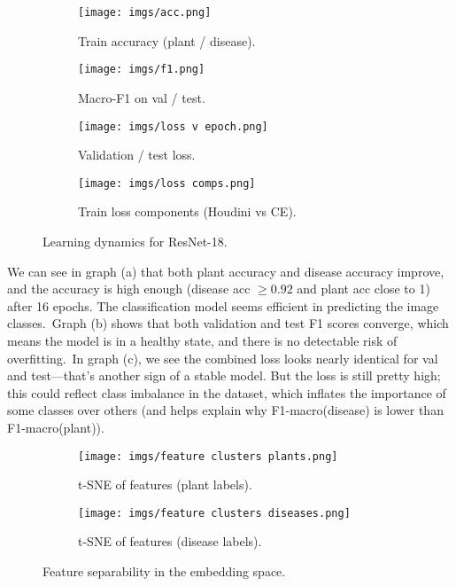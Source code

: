 \documentclass{article}
\begin{document}
\begin{figure}[H]
  \centering
  \begin{subfigure}{0.48\linewidth}
    \texttt{[image: imgs/acc.png]}
    \caption{Train accuracy (plant / disease).}
  \end{subfigure}\hfill
  \begin{subfigure}{0.48\linewidth}
    \texttt{[image: imgs/f1.png]}
    \caption{Macro-F1 on val / test.}
  \end{subfigure}

  \vspace{0.5em}
  \begin{subfigure}{0.48\linewidth}
    \texttt{[image: imgs/loss v epoch.png]}
    \caption{Validation / test loss.}
  \end{subfigure}\hfill
  \begin{subfigure}{0.48\linewidth}
    \texttt{[image: imgs/loss comps.png]}
    \caption{Train loss components (Houdini vs CE).}
  \end{subfigure}
  \caption{Learning dynamics for ResNet-18.}
\end{figure}

We can see in graph (a) that both plant accuracy and disease accuracy improve, and the accuracy is high enough (disease acc $\geq 0.92$ and plant acc close to 1) after 16 epochs. The classification model seems efficient in predicting the image classes.\
Graph (b) shows that both validation and test F1 scores converge, which means the model is in a healthy state, and there is no detectable risk of overfitting.\
In graph (c), we see the combined loss looks nearly identical for val and test—that’s another sign of a stable model. But the loss is still pretty high; this could reflect class imbalance in the dataset, which inflates the importance of some classes over others (and helps explain why F1-macro(disease) is lower than F1-macro(plant)).


\begin{figure}[H]
  \centering
  \begin{subfigure}{0.48\linewidth}
    \texttt{[image: imgs/feature clusters plants.png]}
    \caption{t-SNE of features (plant labels).}
  \end{subfigure}\hfill
  \begin{subfigure}{0.48\linewidth}
    \texttt{[image: imgs/feature clusters diseases.png]}
    \caption{t-SNE of features (disease labels).}
  \end{subfigure}
  \caption{Feature separability in the embedding space.}
\end{figure}
\end{document}
